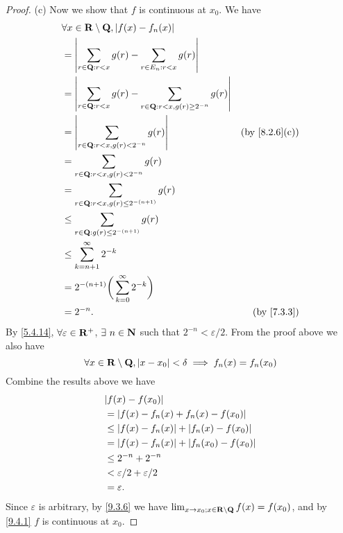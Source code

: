 \begin{proof}{(c)}
  Now we show that \(f\) is continuous at \(x_0\).
  We have
  \begin{align*}
     & \forall x \in \R \setminus \Q, \abs{f(x) - f_n(x)}                                                                  \\
     & = \abs{\sum_{r \in \Q : r < x} g(r) - \sum_{r \in E_n : r < x} g(r)}                                                \\
     & = \abs{\sum_{r \in \Q : r < x} g(r) - \sum_{r \in \Q : r < x, g(r) \geq 2^{-n}} g(r)}                               \\
     & = \abs{\sum_{r \in \Q : r < x, g(r) < 2^{-n}} g(r)}                                   & \text{(by \cref{8.2.6}(c))} \\
     & = \sum_{r \in \Q : r < x, g(r) < 2^{-n}} g(r)                                                                       \\
     & = \sum_{r \in \Q : r < x, g(r) \leq 2^{-(n + 1)}} g(r)                                                              \\
     & \leq \sum_{r \in \Q : g(r) \leq 2^{-(n + 1)}} g(r)                                                                  \\
     & \leq \sum_{k = n + 1}^\infty 2^{-k}                                                                                 \\
     & = 2^{-(n + 1)} \bigg(\sum_{k = 0}^\infty 2^{-k}\bigg)                                                               \\
     & = 2^{-n}.                                                                             & \text{(by \cref{7.3.3})}
  \end{align*}
  By \cref{5.4.14}, \(\forall \varepsilon \in \mathbf{R}^+\), \(\exists\ n \in \mathbf{N}\) such that \(2^{-n} < \varepsilon / 2\).
  From the proof above we also have
  \[
    \forall x \in \mathbf{R} \setminus \mathbf{Q}, \left\lvert x - x_0\right\rvert < \delta \implies f_n(x) = f_n(x_0) \\
  \]
  Combine the results above we have
  \begin{align*}
     & \abs{f(x) - f(x_0)}                              \\
     & = \abs{f(x) - f_n(x) + f_n(x) - f(x_0)}          \\
     & \leq \abs{f(x) - f_n(x)} + \abs{f_n(x) - f(x_0)} \\
     & = \abs{f(x) - f_n(x)} + \abs{f_n(x_0) - f(x_0)}  \\
     & \leq 2^{-n} + 2^{-n}                             \\
     & < \varepsilon / 2 + \varepsilon / 2              \\
     & = \varepsilon.
  \end{align*}
  Since \(\varepsilon\) is arbitrary, by \cref{9.3.6} we have \(\lim_{x \to x_0 ; x \in \mathbf{R} \setminus \mathbf{Q}} f(x) = f(x_0)\), and by \cref{9.4.1} \(f\) is continuous at \(x_0\).
\end{proof}